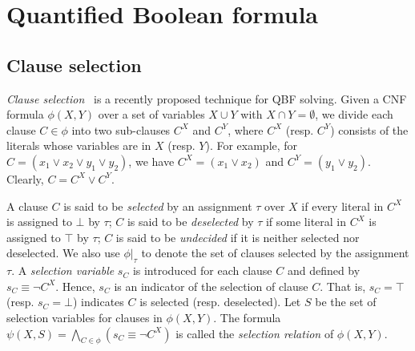 \section{Quantified Boolean formula}
\label{sect:qbf}

\subsection{Clause selection}
\textit{Clause selection}~\cite{Janota2015,Rabe2015} is a recently proposed technique for QBF solving.
Given a CNF formula $\phi(X,Y)$ over a set of variables $X \cup Y$ with $X \cap Y = \emptyset$, we divide each clause $C \in \phi$ into two sub-clauses $C^X$ and $C^Y$, where $C^X$ (resp. $C^Y$) consists of the literals whose variables are in $X$ (resp. $Y$). For example, for $C=(x_1 \vee x_2 \vee y_1 \vee y_2)$, we have $C^X=(x_1 \vee x_2)$ and $C^Y=(y_1 \vee y_2)$. Clearly, $C=C^X \vee C^Y$.

A clause $C$ is said to be \emph{selected} by an assignment $\tau$ over $X$ if every literal in $C^X$ is assigned to $\bot$ by $\tau$; $C$ is said to be \emph{deselected} by $\tau$ if some literal in $C^X$ is assigned to $\top$ by $\tau$; $C$ is said to be \emph{undecided} if it is neither selected nor deselected.
We also use $\phi|_{\tau}$ to denote the set of clauses selected by the assignment $\tau$. A \emph{selection variable} $s_C$ is introduced for each clause $C$ and defined by $s_C \equiv \neg C^X$.
Hence, $s_C$ is an indicator of the selection of clause $C$.
That is, $s_C=\top$ (resp. $s_C=\bot$) indicates $C$ is selected (resp. deselected).
Let $S$ be the set of selection variables for clauses in $\phi(X,Y)$.
The formula $\psi(X,S)=\bigwedge_{C \in \phi}(s_C \equiv \neg C^X)$ is called the \emph{selection relation} of $\phi(X,Y)$.

